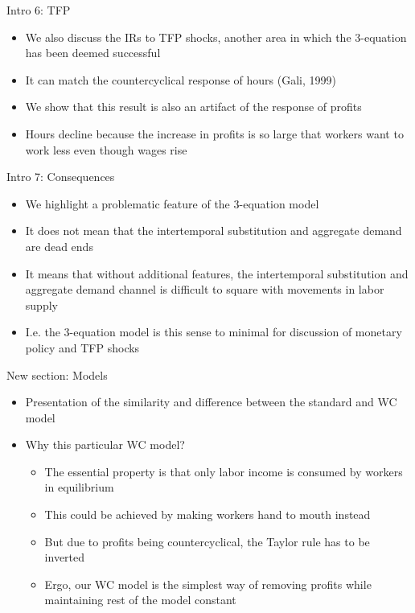 \documentclass{beamer}
\newcommand{\bit}{\begin{itemize}}
\newcommand{\eit}{\end{itemize}}
\begin{document}
\begin{frame}{Intro 6: TFP}

\bit
	\item We also discuss the IRs to TFP shocks, another area in which the 3-equation has been deemed successful 
	\item It can match the countercyclical response of hours (Gali, 1999)
	\item We show that this result is also an artifact of the response of profits
	\item Hours decline because the increase in profits is so large that workers want to work less even though wages rise
\eit


\end{frame}

\begin{frame}{Intro 7: Consequences}

\bit
	\item We highlight a problematic feature of the 3-equation model
	\item It does not mean that the intertemporal substitution and aggregate demand are dead ends
	\item It means that without additional features, the intertemporal substitution and aggregate demand channel is difficult to square with movements in labor supply
	\item I.e. the 3-equation model is this sense to minimal for discussion of monetary policy and TFP shocks
\eit


\end{frame}


\begin{frame}{New section: Models}

\bit
	\item Presentation of the similarity and difference between the standard and WC model
	\item Why this particular WC model?
		\bit
			\item The essential property is that only labor income is consumed by workers in equilibrium
			\item This could be achieved by making workers hand to mouth instead
			\item But due to profits being countercyclical, the Taylor rule has to be inverted
			\item Ergo, our WC model is the simplest way of removing profits while maintaining rest of the model constant 
		\eit
\eit


\end{frame}
\end{document}

